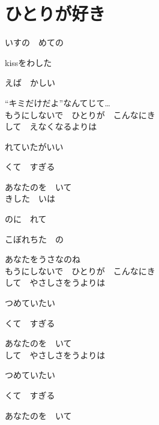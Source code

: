 \section{ ひとりが好き}
\large{

いすの　めての

kissをわした　

えば　かしい

“キミだけだよ”なんてじて…
\\

もうにしないで　ひとりが　こんなにき
\\

して　えなくなるよりは

れていたがいい

くて　すぎる

あなたのを　いて
\\

きした　いは

のに　れて

こぼれちた　の

あなたをうさなのね
\\

もうにしないで　ひとりが　こんなにき
\\

して　やさしさをうよりは

つめていたい

くて　すぎる

あなたのを　いて
\\

して　やさしさをうよりは

つめていたい

くて　すぎる

あなたのを　いて

}